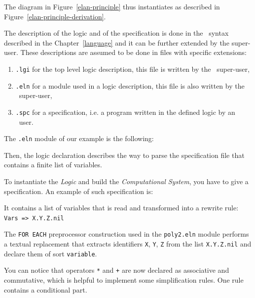 The diagram in Figure~\ref{elan-principle} thus instantiates  as
described in Figure~\ref{elan-principle-derivation}.

\begin{figure}[hbt]
\begin{center}
\end{center}
\end{figure}

The description of the logic and of the specification is done in the
\elan\ syntax described in the Chapter~\ref{language} and it can be
further extended by the super-user. These descriptions are
assumed to be done in files with specific extensions:
\begin{enumerate}
\item{\texttt{.lgi}} for the top level logic description, this file is
        written by the \elan\ super-user,
\item{\texttt{.eln}}  for a module used  in a  logic description, this
        file is also written by the \elan\ super-user,
\item{\texttt{.spc}} for a  specification, i.e.  a program written  in
        the defined logic by an \elan\ user.
\end{enumerate}

The \texttt{.eln} module of our example is the following:

Then, the logic declaration
describes the way to parse the specification file that contains a
finite list of variables.

To instantiate the \textit{Logic} and build
the \textit{Computational System}, you have to give a specification.
An example of such specification is:

It contains a list of variables that is read and transformed into a
rewrite rule: \texttt{Vars => X.Y.Z.nil}

The \texttt{FOR EACH} preprocessor construction used in the
\texttt{poly2.eln} module performs a textual
replacement that extracts identifiers \texttt{X}, \texttt{Y},
\texttt{Z} from the list \texttt{X.Y.Z.nil} and declare them of sort   
\texttt{variable}.

You can notice that operators \texttt{*} and \texttt{+} are now
declared as associative and commutative, which is helpful to
implement some simplification rules.
One rule contains a conditional part.

